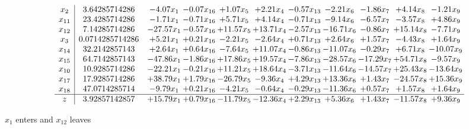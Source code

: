 \documentclass[9pt]{article}
\begin{document}
 \[\begin{array}{c| c c@{\hskip 2pt} c@{\hskip 2pt} c@{\hskip 2pt} c@{\hskip 2pt} c@{\hskip 2pt} c@{\hskip 2pt} c@{\hskip 2pt} c@{\hskip 2pt} c@{\hskip 2pt} }
 x_{2}   &  3.64285714286 & -4.07 x_{1} & -0.07 x_{16} & +  1.07 x_{5} & +  2.21 x_{4} & -0.57 x_{13} & -2.21 x_{6} & -1.86 x_{7} & +  4.14 x_{8} & -1.21 x_{9}\\
 x_{11}   &  23.4285714286 & -1.71 x_{1} & -0.71 x_{16} & +  5.71 x_{5} & +  4.14 x_{4} & -0.71 x_{13} & -9.14 x_{6} & -6.57 x_{7} & -3.57 x_{8} & +  4.86 x_{9}\\
 x_{12}   &  7.14285714286 & -27.57 x_{1} & -0.57 x_{16} & + 11.57 x_{5} & + 13.71 x_{4} & -2.57 x_{13} & -16.71 x_{6} & -0.86 x_{7} & + 15.14 x_{8} & -7.71 x_{9}\\
 x_{3}   &  0.0714285714286 & +  5.21 x_{1} & +  0.21 x_{16} & -2.21 x_{5} & -2.64 x_{4} & +  0.71 x_{13} & +  2.64 x_{6} & +  1.57 x_{7} & -4.43 x_{8} & +  1.64 x_{9}\\
 x_{14}   &  32.2142857143 & +  2.64 x_{1} & +  0.64 x_{16} & -7.64 x_{5} & + 11.07 x_{4} & -0.86 x_{13} & -11.07 x_{6} & -0.29 x_{7} & +  6.71 x_{8} & -10.07 x_{9}\\
 x_{15}   &  64.7142857143 & -47.86 x_{1} & -1.86 x_{16} & + 17.86 x_{5} & + 19.57 x_{4} & -7.86 x_{13} & -28.57 x_{6} & -17.29 x_{7} & + 54.71 x_{8} & -9.57 x_{9}\\
 x_{10}   &  10.9285714286 & -22.21 x_{1} & -0.21 x_{16} & + 11.21 x_{5} & + 18.64 x_{4} & -3.71 x_{13} & -11.64 x_{6} & -14.57 x_{7} & + 25.43 x_{8} & -13.64 x_{9}\\
 x_{17}   &  17.9285714286 & + 38.79 x_{1} & +  1.79 x_{16} & -26.79 x_{5} & -9.36 x_{4} & +  4.29 x_{13} & + 13.36 x_{6} & +  1.43 x_{7} & -24.57 x_{8} & + 15.36 x_{9}\\
 x_{18}   &  47.0714285714 & -9.79 x_{1} & +  0.21 x_{16} & -4.21 x_{5} & -0.64 x_{4} & -0.29 x_{13} & -11.36 x_{6} & +  0.57 x_{7} & +  1.57 x_{8} & +  1.64 x_{9}\\
\hline
z    &  3.92857142857 & + 15.79 x_{1} & +  0.79 x_{16} & -11.79 x_{5} & -12.36 x_{4} & +  2.29 x_{13} & +  5.36 x_{6} & +  1.43 x_{7} & -11.57 x_{8} & +  9.36 x_{9}\\
\end{array}\]


 $ x_{1} $ enters and $ x_{12} $ leaves 
\end{document}
